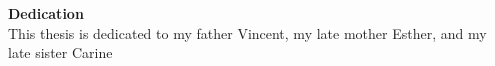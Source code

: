 \documentclass[12pt, a4paper,twoside]{report}
\begin{document}




\setcounter{page}{1}

\newpage
\vspace*{\fill}
\begin{center}
    {\LARGE \textbf{Dedication}} \\[2em]  %
    This thesis is dedicated to my father Vincent, my late mother Esther, and my late sister Carine
\end{center}
\vspace*{\fill}



\newpage
\tableofcontents



\newpage
\listoffigures 

\newpage
\listoftables















\small

\newpage
{}%
\appendix


\end{document}
